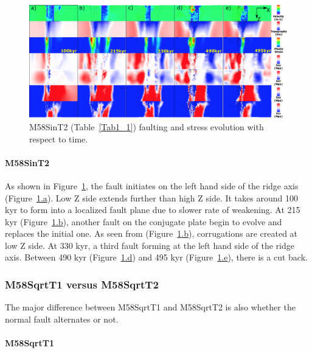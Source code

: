 \begin{figure}[h]
 \centering
  \includegraphics[width=1.0\textwidth]{./Figures/fig_Results_Weakening_6_M58SinT2_time_evolution.eps}
 \caption{M58SinT2 (Table~\hyperref[Tab1_1]{\ref{Tab1_1}}) faulting and stress evolution with respect to time.}
\label{fig_Results_Weakenging_6}
\end{figure}

\paragraph{M58SinT2}\label{para_M58SinT2}

As shown in Figure~\hyperref[fig_Results_Weakenging_6]{\ref{fig_Results_Weakenging_6}}, the fault initiates on the left hand side of the ridge axis (Figure~\hyperref[fig_Results_Weakenging_6]{\ref{fig_Results_Weakenging_6}.a}). Low Z side extends further than high Z side. It takes around 100 kyr to form into a localized fault plane due to slower rate of weakening. At 215 kyr (Figure~\hyperref[fig_Results_Weakenging_6]{\ref{fig_Results_Weakenging_6}.b}), another fault on the conjugate plate begin to evolve and replaces the initial one. As seen from (Figure~\hyperref[fig_Results_Weakenging_6]{\ref{fig_Results_Weakenging_6}.b}), corrugations are created at low Z side. At 330 kyr, a third fault forming at the left hand side of the ridge axis. Between 490 kyr (Figure~\hyperref[fig_Results_Weakenging_6]{\ref{fig_Results_Weakenging_6}.d}) and 495 kyr (Figure~\hyperref[fig_Results_Weakenging_6]{\ref{fig_Results_Weakenging_6}.e}), there is a cut back.

\subsubsection{M58SqrtT1 versus M58SqrtT2}
The major difference between M58SqrtT1 and M58SqrtT2 is also whether the normal fault alternates or not.

\paragraph{M58SqrtT1}\label{para_M58SqrtT1}

